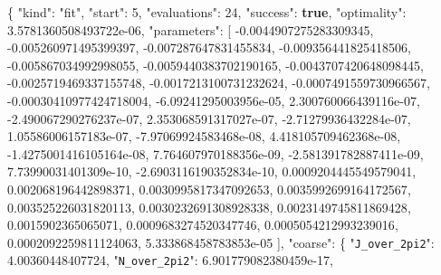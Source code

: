 \documentclass[
  10pt,
]{article}
\newenvironment{Shaded}{}{}
\newcommand{\DataTypeTok}[1]{\textcolor[rgb]{0.56,0.13,0.00}{#1}}
\newcommand{\DecValTok}[1]{\textcolor[rgb]{0.25,0.63,0.44}{#1}}
\newcommand{\FloatTok}[1]{\textcolor[rgb]{0.25,0.63,0.44}{#1}}
\newcommand{\FunctionTok}[1]{\textcolor[rgb]{0.02,0.16,0.49}{#1}}
\newcommand{\KeywordTok}[1]{\textcolor[rgb]{0.00,0.44,0.13}{\textbf{#1}}}
\newcommand{\OtherTok}[1]{\textcolor[rgb]{0.00,0.44,0.13}{#1}}
\newcommand{\StringTok}[1]{\textcolor[rgb]{0.25,0.44,0.63}{#1}}
\begin{document}
\begin{Shaded}
\begin{Highlighting}[]
\FunctionTok{\{}
  \DataTypeTok{"kind"}\FunctionTok{:} \StringTok{"fit"}\FunctionTok{,}
  \DataTypeTok{"start"}\FunctionTok{:} \DecValTok{5}\FunctionTok{,}
  \DataTypeTok{"evaluations"}\FunctionTok{:} \DecValTok{24}\FunctionTok{,}
  \DataTypeTok{"success"}\FunctionTok{:} \KeywordTok{true}\FunctionTok{,}
  \DataTypeTok{"optimality"}\FunctionTok{:} \FloatTok{3.5781360508493722e{-}06}\FunctionTok{,}
  \DataTypeTok{"parameters"}\FunctionTok{:} \OtherTok{[}
    \FloatTok{{-}0.0044907275283309345}\OtherTok{,}
    \FloatTok{{-}0.005260971495399397}\OtherTok{,}
    \FloatTok{{-}0.007287647831455834}\OtherTok{,}
    \FloatTok{{-}0.009356441825418506}\OtherTok{,}
    \FloatTok{{-}0.005867034992998055}\OtherTok{,}
    \FloatTok{{-}0.0059440383702190165}\OtherTok{,}
    \FloatTok{{-}0.0043707420648098445}\OtherTok{,}
    \FloatTok{{-}0.0025719469337155748}\OtherTok{,}
    \FloatTok{{-}0.0017213100731232624}\OtherTok{,}
    \FloatTok{{-}0.0007491559730966567}\OtherTok{,}
    \FloatTok{{-}0.00030410977424718004}\OtherTok{,}
    \FloatTok{{-}6.09241295003956e{-}05}\OtherTok{,}
    \FloatTok{2.300760066439116e{-}07}\OtherTok{,}
    \FloatTok{{-}2.490067290276237e{-}07}\OtherTok{,}
    \FloatTok{2.353068591317027e{-}07}\OtherTok{,}
    \FloatTok{{-}2.71279936432284e{-}07}\OtherTok{,}
    \FloatTok{1.05586006157183e{-}07}\OtherTok{,}
    \FloatTok{{-}7.97069924583468e{-}08}\OtherTok{,}
    \FloatTok{4.418105709462368e{-}08}\OtherTok{,}
    \FloatTok{{-}1.4275001416105164e{-}08}\OtherTok{,}
    \FloatTok{7.764607970188356e{-}09}\OtherTok{,}
    \FloatTok{{-}2.581391782887411e{-}09}\OtherTok{,}
    \FloatTok{7.73990031401309e{-}10}\OtherTok{,}
    \FloatTok{{-}2.6903116190352834e{-}10}\OtherTok{,}
    \FloatTok{0.0009204445549579041}\OtherTok{,}
    \FloatTok{0.002068196442898371}\OtherTok{,}
    \FloatTok{0.0030995817347092653}\OtherTok{,}
    \FloatTok{0.0035992699164172567}\OtherTok{,}
    \FloatTok{0.003525226031820113}\OtherTok{,}
    \FloatTok{0.0030232691308928338}\OtherTok{,}
    \FloatTok{0.0023149745811869428}\OtherTok{,}
    \FloatTok{0.0015902365065071}\OtherTok{,}
    \FloatTok{0.0009683274520347746}\OtherTok{,}
    \FloatTok{0.0005054212993239016}\OtherTok{,}
    \FloatTok{0.0002092259811124063}\OtherTok{,}
    \FloatTok{5.333868458783853e{-}05}
  \OtherTok{]}\FunctionTok{,}
  \DataTypeTok{"coarse"}\FunctionTok{:} \FunctionTok{\{}
    \DataTypeTok{"\nolinkurl{J_over_2pi2}"}\FunctionTok{:} \FloatTok{4.00360448407724}\FunctionTok{,}
    \DataTypeTok{"\nolinkurl{N_over_2pi2}"}\FunctionTok{:} \FloatTok{6.901779082380459e{-}17}\FunctionTok{,}

\end{Highlighting}
\end{Shaded}
\end{document}

